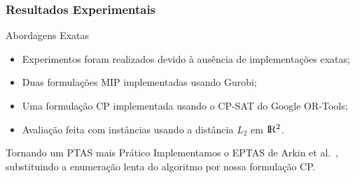 
\subsubsection{Resultados Experimentais}

\begin{frame}{Abordagens Exatas}
  \begin{itemize}[<+->]

    \item Experimentos foram realizados devido à ausência de implementações exatas;

    \item Duas formulações MIP implementadas usando Gurobi;

    \item Uma formulação CP implementada usando o CP-SAT do Google OR-Tools;

    \item Avaliação feita com instâncias usando a distância $L_2$ em $\rm I\!R^2$.

  \end{itemize}
\end{frame}

\begin{frame}{Tornando um PTAS mais Prático}
  Implementamos o EPTAS de Arkin et al.~\cite{Arkin06}, substituindo a enumeração lenta do algoritmo por nossa formulação CP.
\end{frame}
